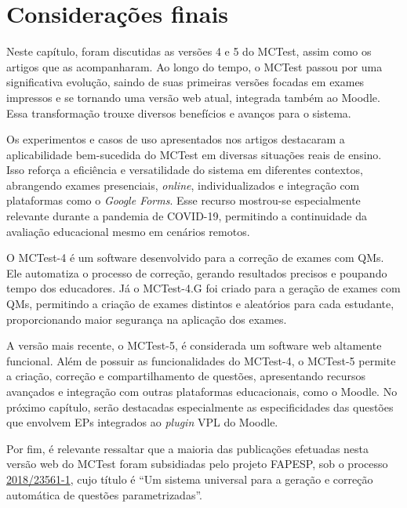\section{Considerações finais}

Neste capítulo, foram discutidas as versões 4 e 5 do MCTest, assim como os artigos que as acompanharam. Ao longo do tempo, o MCTest passou por uma significativa evolução, saindo de suas primeiras versões focadas em exames impressos e se tornando uma versão web atual, integrada também ao Moodle. Essa transformação trouxe diversos benefícios e avanços para o sistema.

Os experimentos e casos de uso apresentados nos artigos destacaram a aplicabilidade bem-sucedida do MCTest em diversas situações reais de ensino. Isso reforça a eficiência e versatilidade do sistema em diferentes contextos, abrangendo exames presenciais, \textit{online}, individualizados e integração com plataformas como o \textit{Google Forms}. Esse recurso mostrou-se especialmente relevante durante a pandemia de COVID-19, permitindo a continuidade da avaliação educacional mesmo em cenários remotos.

O MCTest-4 é um software desenvolvido para a correção de exames com QMs. Ele automatiza o processo de correção, gerando resultados precisos e poupando tempo dos educadores. Já o MCTest-4.G foi criado para a geração de exames com QMs, permitindo a criação de exames distintos e aleatórios para cada estudante, proporcionando maior segurança na aplicação dos exames.

A versão mais recente, o MCTest-5, é considerada um software web altamente funcional. Além de possuir as funcionalidades do MCTest-4, o MCTest-5 permite a criação, correção e compartilhamento de questões, apresentando recursos avançados e integração com outras plataformas educacionais, como o Moodle. No próximo capítulo, serão destacadas especialmente as especificidades das questões que envolvem EPs integrados ao \textit{plugin} VPL do Moodle.

Por fim, é relevante ressaltar que a maioria das publicações efetuadas nesta versão web do MCTest foram subsidiadas pelo projeto FAPESP, sob o processo \href{https://bv.fapesp.br/pt/auxilios/105047/um-sistema-universal-para-geracao-e-correcao-automatica-de-questoes-parametrizadas}{2018/23561-1}, cujo título é ``Um sistema universal para a geração e correção automática de questões parametrizadas''.

